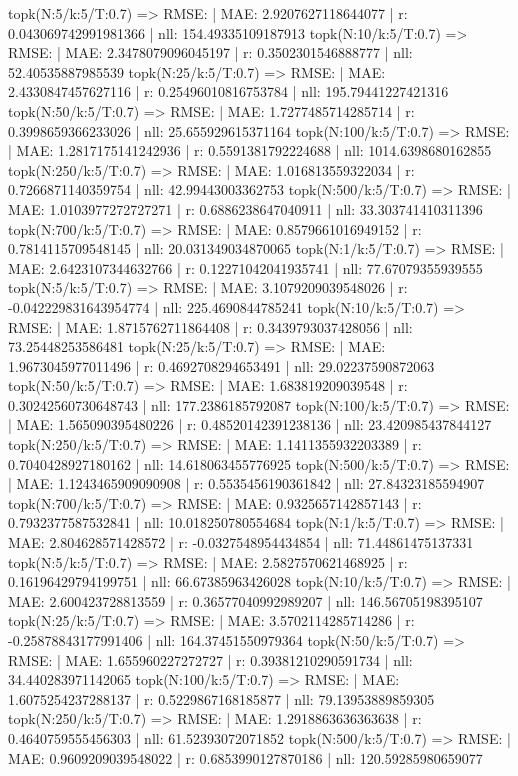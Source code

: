 topk(N:5/k:5/T:0.7) => RMSE: | MAE: 2.9207627118644077 | r: 0.043069742991981366 | nll: 154.49335109187913
topk(N:10/k:5/T:0.7) => RMSE: | MAE: 2.3478079096045197 | r: 0.3502301546888777 | nll: 52.40535887985539
topk(N:25/k:5/T:0.7) => RMSE: | MAE: 2.4330847457627116 | r: 0.25496010816753784 | nll: 195.79441227421316
topk(N:50/k:5/T:0.7) => RMSE: | MAE: 1.7277485714285714 | r: 0.3998659366233026 | nll: 25.655929615371164
topk(N:100/k:5/T:0.7) => RMSE: | MAE: 1.2817175141242936 | r: 0.5591381792224688 | nll: 1014.6398680162855
topk(N:250/k:5/T:0.7) => RMSE: | MAE: 1.016813559322034 | r: 0.7266871140359754 | nll: 42.99443003362753
topk(N:500/k:5/T:0.7) => RMSE: | MAE: 1.0103977272727271 | r: 0.6886238647040911 | nll: 33.303741410311396
topk(N:700/k:5/T:0.7) => RMSE: | MAE: 0.8579661016949152 | r: 0.7814115709548145 | nll: 20.031349034870065
topk(N:1/k:5/T:0.7) => RMSE: | MAE: 2.6423107344632766 | r: 0.12271042041935741 | nll: 77.67079355939555
topk(N:5/k:5/T:0.7) => RMSE: | MAE: 3.1079209039548026 | r: -0.042229831643954774 | nll: 225.4690844785241
topk(N:10/k:5/T:0.7) => RMSE: | MAE: 1.8715762711864408 | r: 0.3439793037428056 | nll: 73.25448253586481
topk(N:25/k:5/T:0.7) => RMSE: | MAE: 1.9673045977011496 | r: 0.4692708294653491 | nll: 29.02237590872063
topk(N:50/k:5/T:0.7) => RMSE: | MAE: 1.683819209039548 | r: 0.30242560730648743 | nll: 177.2386185792087
topk(N:100/k:5/T:0.7) => RMSE: | MAE: 1.565090395480226 | r: 0.48520142391238136 | nll: 23.420985437844127
topk(N:250/k:5/T:0.7) => RMSE: | MAE: 1.1411355932203389 | r: 0.7040428927180162 | nll: 14.618063455776925
topk(N:500/k:5/T:0.7) => RMSE: | MAE: 1.1243465909090908 | r: 0.5535456190361842 | nll: 27.84323185594907
topk(N:700/k:5/T:0.7) => RMSE: | MAE: 0.9325657142857143 | r: 0.7932377587532841 | nll: 10.018250780554684
topk(N:1/k:5/T:0.7) => RMSE: | MAE: 2.804628571428572 | r: -0.0327548954434854 | nll: 71.44861475137331
topk(N:5/k:5/T:0.7) => RMSE: | MAE: 2.5827570621468925 | r: 0.16196429794199751 | nll: 66.67385963426028
topk(N:10/k:5/T:0.7) => RMSE: | MAE: 2.600423728813559 | r: 0.36577040992989207 | nll: 146.56705198395107
topk(N:25/k:5/T:0.7) => RMSE: | MAE: 3.5702114285714286 | r: -0.25878843177991406 | nll: 164.37451550979364
topk(N:50/k:5/T:0.7) => RMSE: | MAE: 1.655960227272727 | r: 0.39381210290591734 | nll: 34.440283971142065
topk(N:100/k:5/T:0.7) => RMSE: | MAE: 1.6075254237288137 | r: 0.5229867168185877 | nll: 79.13953889859305
topk(N:250/k:5/T:0.7) => RMSE: | MAE: 1.2918863636363638 | r: 0.4640759555456303 | nll: 61.52393072071852
topk(N:500/k:5/T:0.7) => RMSE: | MAE: 0.9609209039548022 | r: 0.6853990127870186 | nll: 120.59285980659077
